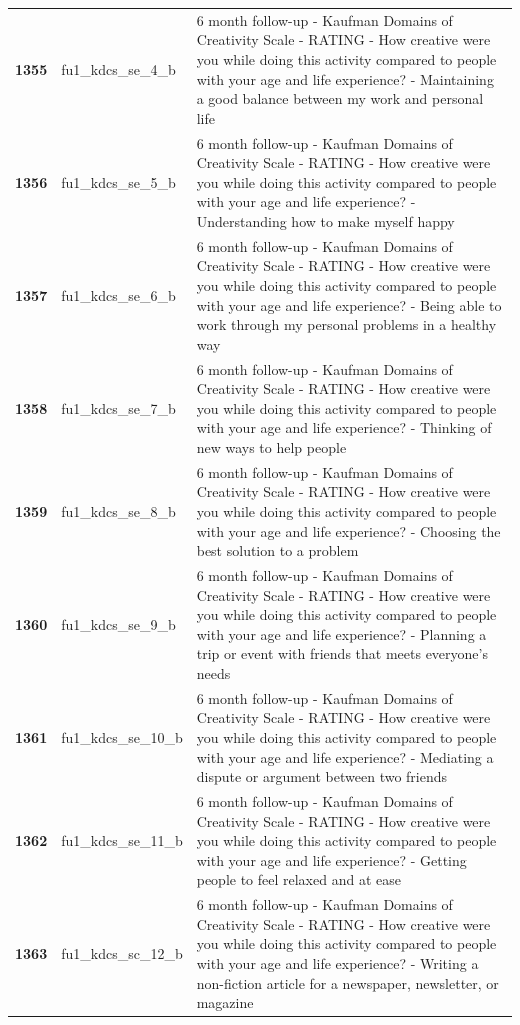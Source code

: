 \documentclass[
  letterpaper,
  DIV=11,
  numbers=noendperiod]{scrartcl}
\begin{document}
\begin{longtable}[t]{>{}cll}
\textbf{1355} & fu1\_kdcs\_se\_4\_b & 6 month follow-up - Kaufman Domains of Creativity Scale - RATING - How creative were you while doing this activity compared to people with your age and life experience? - Maintaining a good balance between my work and personal life\\
\addlinespace
\textbf{1356} & fu1\_kdcs\_se\_5\_b & 6 month follow-up - Kaufman Domains of Creativity Scale - RATING - How creative were you while doing this activity compared to people with your age and life experience? - Understanding how to make myself happy\\
\textbf{1357} & fu1\_kdcs\_se\_6\_b & 6 month follow-up - Kaufman Domains of Creativity Scale - RATING - How creative were you while doing this activity compared to people with your age and life experience? - Being able to work through my personal problems in a healthy way\\
\textbf{1358} & fu1\_kdcs\_se\_7\_b & 6 month follow-up - Kaufman Domains of Creativity Scale - RATING - How creative were you while doing this activity compared to people with your age and life experience? - Thinking of new ways to help people\\
\textbf{1359} & fu1\_kdcs\_se\_8\_b & 6 month follow-up - Kaufman Domains of Creativity Scale - RATING - How creative were you while doing this activity compared to people with your age and life experience? - Choosing the best solution to a problem\\
\textbf{1360} & fu1\_kdcs\_se\_9\_b & 6 month follow-up - Kaufman Domains of Creativity Scale - RATING - How creative were you while doing this activity compared to people with your age and life experience? - Planning a trip or event with friends that meets everyone's needs\\
\addlinespace
\textbf{1361} & fu1\_kdcs\_se\_10\_b & 6 month follow-up - Kaufman Domains of Creativity Scale - RATING - How creative were you while doing this activity compared to people with your age and life experience? - Mediating a dispute or argument between two friends\\
\textbf{1362} & fu1\_kdcs\_se\_11\_b & 6 month follow-up - Kaufman Domains of Creativity Scale - RATING - How creative were you while doing this activity compared to people with your age and life experience? - Getting people to feel relaxed and at ease\\
\textbf{1363} & fu1\_kdcs\_sc\_12\_b & 6 month follow-up - Kaufman Domains of Creativity Scale - RATING - How creative were you while doing this activity compared to people with your age and life experience? - Writing a non-fiction article for a newspaper, newsletter, or magazine\\

\end{longtable}
\end{document}
